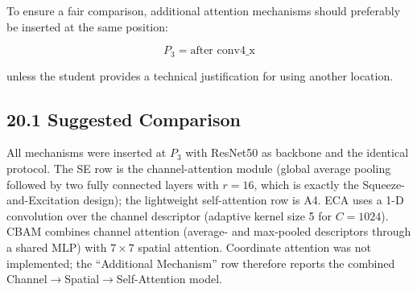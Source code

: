 \documentclass[10pt]{article}
\begin{document}
To ensure a fair comparison, additional attention mechanisms should
preferably be inserted at the same position:

\[
\boxed{
P_3=\text{after conv4\_x}
}
\]

unless the student provides a technical justification for using another
location.

\subsection*{20.1 Suggested Comparison}

\begin{center}

\end{center}


All mechanisms were inserted at $P_3$ with ResNet50 as backbone and the identical protocol. The SE row is the channel-attention
module (global average pooling followed by two fully connected layers with $r=16$, which is exactly the Squeeze-and-Excitation design); the lightweight self-attention row is A4. ECA uses a 1-D convolution over the channel descriptor
(adaptive kernel size 5 for $C=1024$). CBAM combines channel attention (average- and max-pooled descriptors through a shared MLP) with $7\times7$ spatial attention. Coordinate attention was not implemented;
the ``Additional Mechanism'' row therefore reports the combined Channel$\rightarrow$Spatial$\rightarrow$Self-Attention model.
\end{document}
